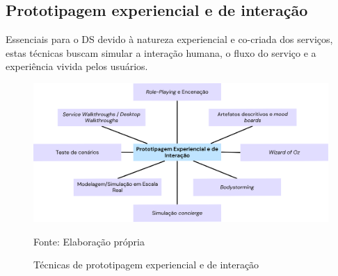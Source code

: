 \subsection{Prototipagem experiencial e de interação}

Essenciais para o DS devido à natureza experiencial e co-criada dos serviços, estas técnicas buscam simular a interação humana, o fluxo do serviço e a experiência vivida pelos usuários.

\begin{figure}[H]
	\centering
	\includegraphics[width=1\linewidth]{figuras/experiencial-interacao}
	\caption{Técnicas de prototipagem experiencial e de interação}
	Fonte: Elaboração própria
	\label{fig:categorias-prototipacao}
\end{figure}

